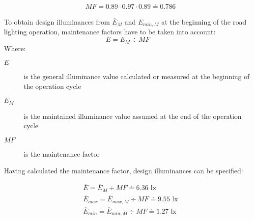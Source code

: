 \begin{align}
\label{eq:MFSpecific}
&MF = 0.89 \cdot 0.97 \cdot 0.89 \doteq 0.786
\end{align}

To obtain design illuminances from $\overline{E}_{M}$ and $E_{min,M}$ at the beginning of the road lighting operation, maintenance factors have to be taken into account:
\begin{equation}
E = E_{M} \div MF
\end{equation}
Where:
\begin{description}
	\item[$E$] is the general illuminance value calculated or measured at the beginning of the operation cycle
	\item[$E_{M}$] is the maintained illuminance value assumed at the end of the operation cycle
	\item[$MF$] is the maintenance factor
\end{description}

Having calculated the maintenance factor, design illuminances can be specified:

\begin{align}
&\overline{E} = \overline{E}_{M} \div MF \doteq 6.36 \text{ lx}\\
&\overline{E}_{max} = \overline{E}_{max,M} \div MF \doteq 9.55 \text{ lx}\\
&\overline{E}_{min} = \overline{E}_{min,M} \div MF \doteq 1.27 \text{ lx}\\
\end{align}
